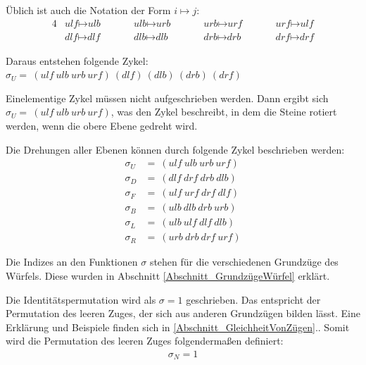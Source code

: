 \documentclass[12pt,a4paper, usenames, dvipsnames]{article}
\theoremstyle{mystyle}
\theoremstyle{definition}
\begin{document}
Üblich ist auch die Notation der Form $i \mapsto j$: 
\begin{alignat*}{4}
& \textit{ulf} \mapsto \textit{ulb} \ \ \ \ \ \ \ \ && \textit{ulb} \mapsto \textit{urb} \ \ \ \ \ \ \ \ && \textit{urb} \mapsto \textit{urf} \ \ \ \ \ \ \ \ && \textit{urf} \mapsto \textit{ulf} \\
& \textit{dlf} \mapsto \textit{dlf} \ \ \ \ \ \ \ \ && \textit{dlb} \mapsto \textit{dlb} \ \ \ \ \ \ \ \ \ && \textit{drb} \mapsto \textit{drb} \ \ \ \ \ \ \ \ && \textit{drf} \mapsto \textit{drf} 
\end{alignat*}

Daraus entstehen folgende Zykel: $\sigma_U = \ ( \textit{ulf} \ \textit{ulb} \ \textit{urb} \ \textit{urf} )\ ( \textit{dlf} )\ ( \textit{dlb} )\ ( \textit{drb} )\ ( \textit{drf} )$

Einelementige Zykel müssen nicht aufgeschrieben werden. Dann ergibt sich $\sigma_U = \ ( \textit{ulf} \ \textit{ulb} \ \textit{urb} \ \textit{urf} )$, was den Zykel beschreibt, in dem die Steine rotiert werden, wenn die obere Ebene gedreht wird. 


Die Drehungen aller Ebenen können durch folgende Zykel beschrieben werden: 
\begin{align*}
\sigma_U & =\ ( \textit{ulf} \ \textit{ulb} \ \textit{urb} \ \textit{urf} ) \\
\sigma_D & =\ ( \textit{dlf} \ \textit{drf} \ \textit{drb} \ \textit{dlb} ) \\
\sigma_F & =\ ( \textit{ulf} \ \textit{urf} \ \textit{drf} \ \textit{dlf} ) \\
\sigma_B & =\ ( \textit{ulb} \ \textit{dlb} \ \textit{drb} \ \textit{urb} ) \\
\sigma_L & =\ ( \textit{ulb} \ \textit{ulf} \ \textit{dlf} \ \textit{dlb} ) \\
\sigma_R & =\ ( \textit{urb} \ \textit{drb} \ \textit{drf} \ \textit{urf} ) 
\end{align*}

Die Indizes an den Funktionen $\sigma$ stehen für die verschiedenen Grundzüge des Würfels. Diese wurden in Abschnitt \ref{Abschnitt_GrundzügeWürfel} erklärt.

Die Identitätspermutation wird als $\sigma=1$ geschrieben. Das entspricht der Permutation des leeren Zuges, der sich aus anderen Grundzügen bilden lässt. Eine Erklärung und Beispiele finden sich in \ref{Abschnitt_GleichheitVonZügen}..
Somit wird die Permutation des leeren Zuges folgendermaßen definiert:
\begin{align*}
\sigma_N = 1
\end{align*}
\end{document}
